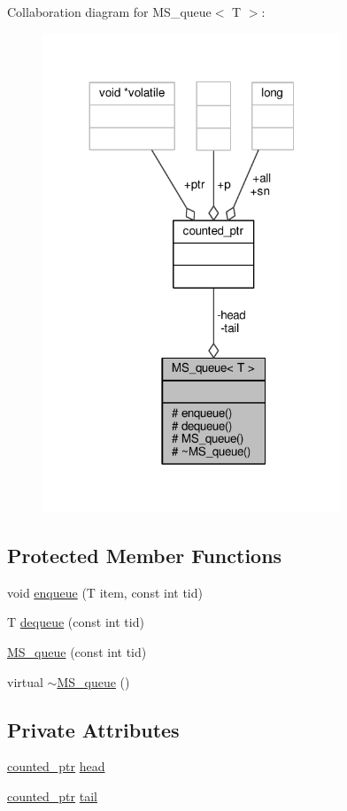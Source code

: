 Collaboration diagram for M\-S\-\_\-queue$<$ T $>$\-:
\nopagebreak
\begin{figure}[H]
\begin{center}
\leavevmode
\includegraphics[width=252pt]{classMS__queue__coll__graph}
\end{center}
\end{figure}
\subsection*{Protected Member Functions}
\begin{DoxyCompactItemize}
\item 
void \hyperlink{classMS__queue_aa8d33c46343874ae7e918c9058bc6fc3}{enqueue} (T item, const int tid)
\item 
T \hyperlink{classMS__queue_a78a5210001367491d3184c55a7788cdb}{dequeue} (const int tid)
\item 
\hyperlink{classMS__queue_ae4ba0c987f8efae263ffeba2c96579a2}{M\-S\-\_\-queue} (const int tid)
\item 
virtual \hyperlink{classMS__queue_a482f0d5266ee26f9f4cb7d889cd80527}{$\sim$\-M\-S\-\_\-queue} ()
\end{DoxyCompactItemize}
\subsection*{Private Attributes}
\begin{DoxyCompactItemize}
\item 
\hyperlink{unioncounted__ptr}{counted\-\_\-ptr} \hyperlink{classMS__queue_aa962c048d3b83e09562a5147d5af33fe}{head}
\item 
\hyperlink{unioncounted__ptr}{counted\-\_\-ptr} \hyperlink{classMS__queue_a644daae43a3ae28f04693962eaf9698d}{tail}
\end{DoxyCompactItemize}


